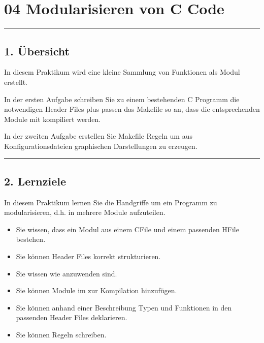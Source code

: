 \documentclass[a4paper,10pt,english]{report}
\begin{document}
\chapter{04 \sphinxhyphen{} Modularisieren von C Code}
\label{\detokenize{P04_Modularisieren_von_C_Code/new_P04/P04_Modularisieren_von_C_Code:modularisieren-von-c-code}}\label{\detokenize{P04_Modularisieren_von_C_Code/new_P04/P04_Modularisieren_von_C_Code::doc}}

\bigskip\hrule\bigskip



\section{1. Übersicht}
\label{\detokenize{P04_Modularisieren_von_C_Code/new_P04/P04_Modularisieren_von_C_Code:ubersicht}}
\sphinxAtStartPar
In diesem Praktikum wird eine kleine Sammlung von Funktionen als Modul erstellt.

\sphinxAtStartPar
In der ersten Aufgabe schreiben Sie zu einem bestehenden C Programm die notwendigen Header Files plus passen das Makefile so an, dass die entsprechenden Module mit kompiliert werden.

\sphinxAtStartPar
In der zweiten Aufgabe erstellen Sie Makefile Regeln um aus Konfigurationsdateien graphischen Darstellungen zu erzeugen.


\bigskip\hrule\bigskip



\section{2. Lernziele}
\label{\detokenize{P04_Modularisieren_von_C_Code/new_P04/P04_Modularisieren_von_C_Code:lernziele}}
\sphinxAtStartPar
In diesem Praktikum lernen Sie die Handgriffe um ein Programm zu modularisieren, d.h. in mehrere Module aufzuteilen.
\begin{itemize}
\item {} 
\sphinxAtStartPar
Sie wissen, dass ein Modul aus einem C\sphinxhyphen{}File und einem passenden H\sphinxhyphen{}File bestehen.

\item {} 
\sphinxAtStartPar
Sie können Header Files korrekt strukturieren.

\item {} 
\sphinxAtStartPar
Sie wissen wie  anzuwenden sind.

\item {} 
\sphinxAtStartPar
Sie können Module im  zur Kompilation hinzufügen.

\item {} 
\sphinxAtStartPar
Sie können anhand einer Beschreibung Typen und Funktionen in den passenden Header Files deklarieren.

\item {} 
\sphinxAtStartPar
Sie können  Regeln schreiben.

\end{itemize}
\end{document}
